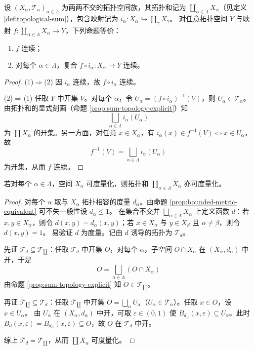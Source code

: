 \documentclass[lang=cn,a4paper,newtx,figureplace=section,tableplace=section]{elegantbook}
\begin{document}
\begin{proposition}\label{prop:coprod-continuity}
  设 $(X_\alpha,\mathcal T_\alpha)_{\alpha\in\Lambda}$ 为两两不交的拓扑空间族，其拓扑和记为 $\coprod_{\alpha\in\Lambda}X_\alpha$（见定义 \ref{def:topological-sum}），包含映射记为 $i_\alpha:X_\alpha\hookrightarrow\coprod_{\gamma}X_\gamma$。
  对任意拓扑空间 $Y$ 与映射 $f:\coprod_{\alpha\in\Lambda}X_\alpha\to Y$，下列命题等价：
  \begin{enumerate}
    \item $f$ 连续；
    \item 对每个 $\alpha\in\Lambda$，复合 $f\circ i_\alpha:X_\alpha\to Y$ 连续。
  \end{enumerate}
\end{proposition}
\begin{proof}
  (1)$\Rightarrow$(2) 因 $i_\alpha$ 连续，故 $f\circ i_\alpha$ 连续。

  (2)$\Rightarrow$(1) 任取 $Y$ 中开集 $V$。对每个 $\alpha$，令 $U_\alpha=(f\circ i_\alpha)^{-1}(V)$，则 $U_\alpha\in\mathcal T_\alpha$。
  由拓扑和的显式刻画（命题 \ref{prop:sum-topology-explicit}）知
  \[
    \bigsqcup_{\alpha\in\Lambda} i_\alpha(U_\alpha)
  \]
  为 $\coprod X_\alpha$ 的开集。另一方面，对任意 $x\in X_\alpha$，有 $i_\alpha(x)\in f^{-1}(V)\iff x\in U_\alpha$，故
  \[
    f^{-1}(V)=\bigsqcup_{\alpha\in\Lambda} i_\alpha(U_\alpha)
  \]
  为开集，从而 $f$ 连续。
\end{proof}

\begin{proposition}\label{prop:coprod-metrizable}
  若对每个 $\alpha\in\Lambda$，空间 $X_\alpha$ 可度量化，则拓扑和 $\coprod_{\alpha\in\Lambda}X_\alpha$ 亦可度量化。
\end{proposition}
\begin{proof}
  对每个 $\alpha$ 取与 $X_\alpha$ 拓扑相容的度量 $d_\alpha$。由命题 \ref{prop:bounded-metric-equivalent} 可不失一般性设 $d_\alpha\le 1$。
  在集合不交并 $\bigsqcup_{\alpha\in\Lambda}X_\alpha$ 上定义函数 $d$：若 $x,y\in X_\alpha$，则令 $d(x,y)=d_\alpha(x,y)$；若 $x\in X_\alpha$ 与 $y\in X_\beta$ 且 $\alpha\neq\beta$，则令 $d(x,y)=1$。
  易验证 $d$ 为度量。记由 $d$ 诱导的拓扑为 $\mathcal T_d$。

  先证 $\mathcal T_d\subseteq\mathcal T_{\coprod}$：任取 $\mathcal T_d$ 中开集 $O$，对每个 $\alpha$，子空间 $O\cap X_\alpha$ 在 $(X_\alpha,d_\alpha)$ 中开，于是
  \[
    O=\bigsqcup_{\alpha\in\Lambda}(O\cap X_\alpha)
  \]
  由命题 \ref{prop:sum-topology-explicit} 知 $O\in\mathcal T_{\coprod}$。

  再证 $\mathcal T_{\coprod}\subseteq\mathcal T_d$：任取 $\mathcal T_{\coprod}$ 中开集 $O=\bigsqcup_{\alpha}U_\alpha$（$U_\alpha\in\mathcal T_\alpha$）。任取 $x\in O$，设 $x\in U_\alpha$。
  由 $U_\alpha$ 在 $(X_\alpha,d_\alpha)$ 中开，可取 $\varepsilon\in(0,1)$ 使 $B_{d_\alpha}(x,\varepsilon)\subseteq U_\alpha$。此时 $B_d(x,\varepsilon)=B_{d_\alpha}(x,\varepsilon)\subseteq O$，故 $O$ 在 $\mathcal T_d$ 中开。

  综上 $\mathcal T_d=\mathcal T_{\coprod}$，从而 $\coprod X_\alpha$ 可度量化。
\end{proof}
\end{document}
